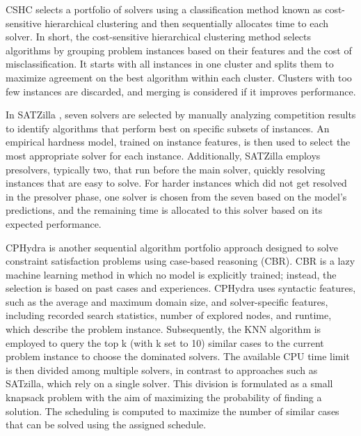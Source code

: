 CSHC \cite{10.5555/2540128.2540217} selects a portfolio of solvers using a classification method known as cost-sensitive hierarchical clustering and then sequentially allocates time to each solver. In short, the cost-sensitive hierarchical clustering method selects algorithms by grouping problem instances based on their features and the cost of misclassification. It starts with all instances in one cluster and splits them to maximize agreement on the best algorithm within each cluster. Clusters with too few instances are discarded, and merging is considered if it improves performance.

In SATZilla \cite{satzilla}, seven solvers are selected by manually analyzing competition results to identify algorithms that perform best on specific subsets of instances. An empirical hardness model, trained on instance features, is then used to select the most appropriate solver for each instance. Additionally, SATZilla employs presolvers, typically two, that run before the main solver, quickly resolving instances that are easy to solve. For harder instances which did not get resolved in the presolver phase, one solver is chosen from the seven based on the model's predictions, and the remaining time is allocated to this solver based on its expected performance.

CPHydra \cite{cphydra} is another sequential algorithm portfolio approach designed to solve constraint satisfaction problems using case-based reasoning (CBR). CBR is a lazy machine learning method in which no model is explicitly trained; instead, the selection is based on past cases and experiences. CPHydra uses syntactic features, such as the average and maximum domain size, and solver-specific features, including recorded search statistics, number of explored nodes, and runtime, which describe the problem instance. Subsequently, the KNN algorithm is employed to query the top k (with k set to 10) similar cases to the current problem instance to choose the dominated solvers. The available CPU time limit is then divided among multiple solvers, in contrast to approaches such as SATzilla, which rely on a single solver. This division is formulated as a small knapsack problem with the aim of maximizing the probability of finding a solution. The scheduling is computed to maximize the number of similar cases that can be solved using the assigned schedule. 

